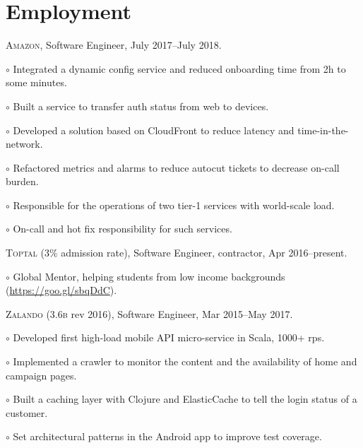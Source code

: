 \documentclass[letterpaper]{article}
\renewenvironment{itemize}{
  \begin{list}{}{
    \setlength{\leftmargin}{1.5em}
  }
}{
  \end{list}
}
\newenvironment{no-indent-itemize}{
  \begin{list}{}{
    \setlength{\leftmargin}{0em}
  }
}{
  \end{list}
}
\def\bullet{$\circ$\xspace}
\begin{document}
\section*{Employment}
\begin{no-indent-itemize}
  \item \textsc{Amazon}, Software Engineer, July 2017--July 2018.
  \begin{itemize}
    \item\bullet Integrated a dynamic config service and reduced onboarding time from 2h to some minutes.
    \item\bullet Built a service to transfer auth status from web to devices.
    \item\bullet Developed a solution based on CloudFront to reduce latency and time-in-the-network.
    \item\bullet Refactored metrics and alarms to reduce autocut tickets to decrease on-call burden.
    \item\bullet Responsible for the operations of two tier-1 services with world-scale load.
    \item\bullet On-call and hot fix responsibility for such services.
  \end{itemize}
  \item \textsc{Toptal} (3\% admission rate), Software Engineer, contractor, Apr 2016--present.
  \begin{itemize}
    \item\bullet Global Mentor, helping students from low income backgrounds (\href{https://goo.gl/sbqDdC}{https://goo.gl/sbqDdC}).
  \end{itemize}
  \item \textsc{Zalando} (3.6\textsc{b} rev 2016), Software Engineer, Mar 2015--May 2017.
  \begin{itemize}
    \item\bullet Developed first high-load mobile API micro-service in Scala, 1000+ rps.
    \item\bullet Implemented a crawler to monitor the content and the availability of home and campaign pages.
    \item\bullet Built a caching layer with Clojure and ElasticCache to tell the login status of a customer.
    \item\bullet Set architectural patterns in the Android app to improve test coverage.

\end{itemize}
\end{no-indent-itemize}
\end{document}
